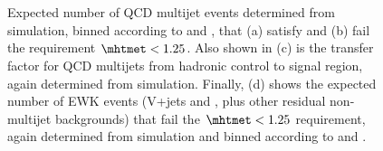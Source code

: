 \begin{figure}[!h]
  \centering
   ~
   \\
   ~ 
   \\
  \caption{Expected number of QCD multijet events determined from
    simulation, binned according to \njet and \scalht, that (a) satisfy
    and (b) fail the requirement $\mhtmet < 1.25$. Also shown in (c)
    is the transfer factor for QCD multijets from hadronic control to signal region, 
    again determined from simulation. Finally, (d) shows the expected number of EWK events
    (V+jets and \ttbar, plus other residual non-multijet backgrounds)
    that fail the $\mhtmet < 1.25$ requirement, again determined from
    simulation and binned according to \njet and \scalht.}
  \label{fig:qcd_plots}
\end{figure}

